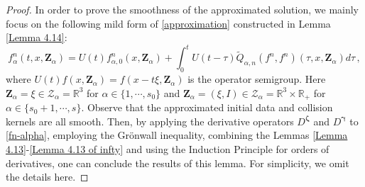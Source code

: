 \documentclass[reqno,11pt]{amsart}
\numberwithin{equation}{section}
\def\R{\mathbb{R}}
\begin{document}
\begin{proof}
  In order to prove the smoothness of the approximated solution, we mainly focus on the following mild form of \eqref{approximation} constructed in Lemma \ref{Lemma 4.14}:
  \begin{equation}\label{fn-alpha}
	f^n_{\alpha} (t,x,\mathbf{Z}_\alpha) = U(t) f^n_{\alpha, 0} (x, \mathbf{Z}_\alpha) + \int_{0}^{t} U(t-\tau) \tilde{Q}_{\alpha ,n} (f^n ,f^n) (\tau, x, \mathbf{Z}_\alpha) d \tau \,,
\end{equation}
where $U(t) f (x, \mathbf{Z}_\alpha) = f (x - t \xi, \mathbf{Z}_\alpha)$ is the operator semigroup. Here $\mathbf{Z}_\alpha = \xi \in \mathcal{Z}_\alpha = \R^3$ for $\alpha \in \{ 1, \cdots, s_0 \}$ and $\mathbf{Z}_\alpha = (\xi, I) \in \mathcal{Z}_\alpha = \R^3 \times \R_+$ for $\alpha \in \{ s_0 + 1, \cdots, s \}$. Observe that the approximated initial data and collision kernels are all smooth. Then, by applying the derivative operators $D^{ \boldsymbol{\zeta} }$ and $ D^{ \boldsymbol{\gamma} } $ to \eqref{fn-alpha}, employing the Gr\"onwall inequality, combining the Lemmas \ref{Lemma 4.13}-\ref{Lemma 4.13 of infty} and using the Induction Principle for orders of derivatives, one can conclude the results of this lemma. For simplicity, we omit the details here.
\end{proof}
\end{document}
